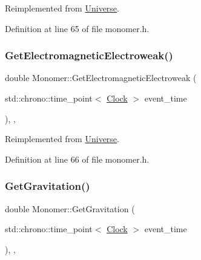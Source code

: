 Reimplemented from \hyperlink{class_universe_a63b850ef3f3394313353109d222bf5d1}{Universe}.



Definition at line 65 of file monomer.\+h.

\mbox{\label{class_monomer_a9b270cd1293bc9635813ead284bd3881}} 
\subsubsection{\texorpdfstring{Get\+Electromagnetic\+Electroweak()}{GetElectromagneticElectroweak()}}
{\footnotesize\ttfamily double Monomer\+::\+Get\+Electromagnetic\+Electroweak (\begin{DoxyParamCaption}\item[{std\+::chrono\+::time\+\_\+point$<$ \hyperlink{universe_8h_a0ef8d951d1ca5ab3cfaf7ab4c7a6fd80}{Clock} $>$}]{event\+\_\+time }\end{DoxyParamCaption})\hspace{0.3cm}{\ttfamily [inline]}, {\ttfamily [final]}, {\ttfamily [virtual]}}



Reimplemented from \hyperlink{class_universe_a9f099605c082e7fa755787a6a8cab7ba}{Universe}.



Definition at line 66 of file monomer.\+h.

\mbox{\label{class_monomer_aa5f7b901e15c9a9eb6e1c3564cd06e4f}} 
\subsubsection{\texorpdfstring{Get\+Gravitation()}{GetGravitation()}}
{\footnotesize\ttfamily double Monomer\+::\+Get\+Gravitation (\begin{DoxyParamCaption}\item[{std\+::chrono\+::time\+\_\+point$<$ \hyperlink{universe_8h_a0ef8d951d1ca5ab3cfaf7ab4c7a6fd80}{Clock} $>$}]{event\+\_\+time }\end{DoxyParamCaption})\hspace{0.3cm}{\ttfamily [inline]}, {\ttfamily [final]}, {\ttfamily [virtual]}}



